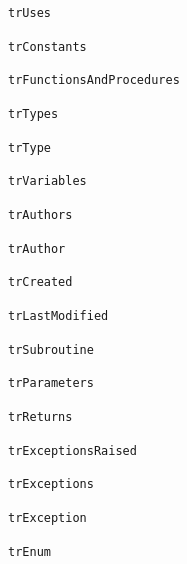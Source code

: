 \documentclass{report}
\begin{document}
\begin{list}{}
\begin{description}
\item[\texttt{trUses}] \label{PasDoc_Languages-trUses}
\index{}
 
\item[\texttt{trConstants}] \label{PasDoc_Languages-trConstants}
\index{}
 
\item[\texttt{trFunctionsAndProcedures}] \label{PasDoc_Languages-trFunctionsAndProcedures}
\index{}
 
\item[\texttt{trTypes}] \label{PasDoc_Languages-trTypes}
\index{}
 
\item[\texttt{trType}] \label{PasDoc_Languages-trType}
\index{}
 
\item[\texttt{trVariables}] \label{PasDoc_Languages-trVariables}
\index{}
 
\item[\texttt{trAuthors}] \label{PasDoc_Languages-trAuthors}
\index{}
 
\item[\texttt{trAuthor}] \label{PasDoc_Languages-trAuthor}
\index{}
 
\item[\texttt{trCreated}] \label{PasDoc_Languages-trCreated}
\index{}
 
\item[\texttt{trLastModified}] \label{PasDoc_Languages-trLastModified}
\index{}
 
\item[\texttt{trSubroutine}] \label{PasDoc_Languages-trSubroutine}
\index{}
 
\item[\texttt{trParameters}] \label{PasDoc_Languages-trParameters}
\index{}
 
\item[\texttt{trReturns}] \label{PasDoc_Languages-trReturns}
\index{}
 
\item[\texttt{trExceptionsRaised}] \label{PasDoc_Languages-trExceptionsRaised}
\index{}
 
\item[\texttt{trExceptions}] \label{PasDoc_Languages-trExceptions}
\index{}
 
\item[\texttt{trException}] \label{PasDoc_Languages-trException}
\index{}
 
\item[\texttt{trEnum}] \label{PasDoc_Languages-trEnum}
\index{}
 

\end{description}
\end{list}
\end{document}
